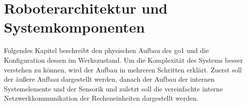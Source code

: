 \section{Roboterarchitektur und Systemkomponenten}
\label{sec:roboterarchitektur-und-systemkomponenten}

Folgendes Kapitel beschreibt den physischen Aufbau des \gls{go1} und die Konfiguration dessen im Werkszustand.
Um die Komplexität des Systems besser verstehen zu können, wird der Aufbau in mehreren Schritten erklärt.
Zuerst soll der äußere Aufbau dargestellt werden, danach der Aufbau der internen Systemelemente und der Sensorik und zuletzt
soll die vereinfachte interne Netzwerkkommunikation der Recheneinheiten dargestellt werden.




